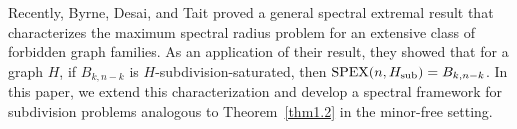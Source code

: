 \documentclass[11pt, a4paper]{article}
\theoremstyle{definition}
\newcommand{\<}{\subseteq}
\begin{document}
 
Recently, Byrne, Desai, and Tait \cite{byrne2024general} proved a general spectral extremal result that characterizes the maximum spectral radius problem for an extensive class of forbidden graph families. %
As an application of their result, they showed that for a graph $H$, if $B_{k,n-k}$ is $H$-subdivision-saturated,  then ${\rm SPEX}(n, H_{\rm sub}) = B_{k,n-k}$.
In this paper, we extend this characterization and develop a spectral framework for subdivision problems analogous to Theorem~\ref{thm1.2} in the minor-free setting. %
\end{document}
